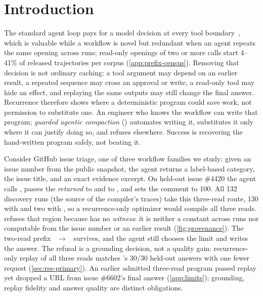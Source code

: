 \section{Introduction}

The standard agent loop pays for a model decision at every tool
boundary~\citep{yao2023react}, which is valuable while a workflow is novel but
redundant when an agent repeats the same opening across runs; read\nobreakdash-only
openings of two or more calls start 4--41\% of released trajectories per corpus
(\cref{app:prefix-census}). Removing that decision is not ordinary caching: a
tool argument may depend on an earlier result, a repeated sequence may cross an
approval or write, a read\nobreakdash-only tool may hide an effect, and
replaying the same outputs may still change the final answer. Recurrence
therefore shows where a deterministic program could save work, not permission
to substitute one. An engineer who knows the workflow can write that program;
\emph{guarded agentic compaction} (\method) automates writing it, substitutes it
only where it can justify doing so, and refuses elsewhere. Success is recovering
the hand-written program safely, not beating it.

Consider GitHub issue triage, one of three workflow families we study: given
an issue number from the public  snapshot, the agent
returns a label-based category, the issue title, and an exact evidence excerpt.
On held-out issue \#4420 the agent calls , passes the
\emph{returned}  to  and to
, and sets the comment  to 100. All 132 discovery
runs (the source of the compiler's traces) take this three-read route, 130
with  and two with , so a recurrence-only optimizer would compile all three reads.
\method refuses that region because  has no \emph{witness}: it is
neither a constant across runs nor computable from the issue number or an
earlier result (\cref{fig:provenance}). The two-read prefix
~$\rightarrow$~ survives, and the agent still chooses the limit and writes the answer. The
refusal is a grounding decision, not a quality gain: recurrence-only replay of
all three reads matches \method's 30/30 held-out answers with one fewer request
(\cref{sec:res-primary}). An earlier admitted three-read program passed replay
yet dropped a URL from issue \#6602's final answer (\cref{app:limits});
grounding, replay fidelity and answer quality are distinct obligations.

